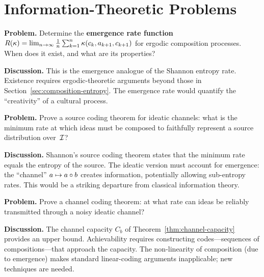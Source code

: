 \section{Information-Theoretic Problems}
\label{sec:open-info}

\begin{game}
\label{op:emergence-rate}
\textbf{Problem.}  Determine the \textbf{emergence rate function}
$R(\kappa) = \lim_{n\to\infty} \frac{1}{n}
\sum_{k=1}^{n} \kappa(c_k, a_{k+1}, c_{k+1})$ for ergodic
composition processes.  When does it exist, and what are its
properties?

\textbf{Discussion.}  This is the emergence analogue of the
Shannon entropy rate.  Existence requires ergodic-theoretic
arguments beyond those in Section~\ref{sec:composition-entropy}.
The emergence rate would quantify the ``creativity'' of a
cultural process.
\end{game}

\begin{game}
\label{op:source-coding}
\textbf{Problem.}  Prove a source coding theorem for ideatic
channels: what is the minimum rate at which ideas must be
composed to faithfully represent a source distribution over~$\mathcal{I}$?

\textbf{Discussion.}  Shannon's source coding theorem states
that the minimum rate equals the entropy of the source.  The
ideatic version must account for emergence: the ``channel''
$a \mapsto a \circ b$ creates information, potentially
allowing sub-entropy rates.  This would be a striking departure
from classical information theory.
\end{game}

\begin{game}
\label{op:channel-coding}
\textbf{Problem.}  Prove a channel coding theorem:  at what rate
can ideas be reliably transmitted through a noisy ideatic channel?

\textbf{Discussion.}  The channel capacity $C_b$ of
Theorem~\ref{thm:channel-capacity} provides an upper bound.
Achievability requires constructing codes---sequences of
compositions---that approach the capacity.  The non-linearity
of composition (due to emergence) makes standard linear-coding
arguments inapplicable; new techniques are needed.
\end{game}

